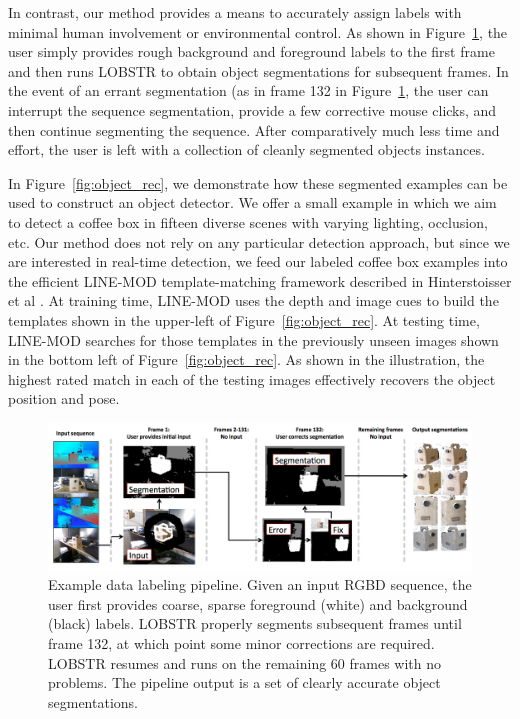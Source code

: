 \documentclass[graybox]{svmult}
\begin{document}
In contrast, our method provides a means to accurately assign labels with minimal human involvement or environmental control. As shown in Figure~\ref{fig:data_labeling}, the user simply provides rough background and foreground labels to the first frame and then runs LOBSTR to obtain object segmentations for subsequent frames.  In the event of an errant segmentation (as in frame 132 in  Figure~\ref{fig:data_labeling}, the user can interrupt the sequence segmentation, provide a few corrective mouse clicks, and then continue segmenting the sequence.  After comparatively much less time and effort, the user is left with a collection of cleanly segmented objects instances.

In Figure~\ref{fig:object_rec}, we demonstrate how these segmented examples can be used to construct an object detector. We offer a small example in which we aim to detect a coffee box in fifteen diverse scenes with varying lighting, occlusion, etc.  Our method does not rely on any particular  detection approach, but since we are interested in real-time detection, we feed our labeled coffee box examples into the efficient LINE-MOD template-matching framework described in Hinterstoisser et al \cite{hinterstoisser2011a}. At training time, LINE-MOD uses the depth and image cues to build the templates shown in the upper-left of Figure~\ref{fig:object_rec}. At testing time, LINE-MOD searches for those templates in the previously unseen images shown in the bottom left of Figure~\ref{fig:object_rec}.  As shown in the illustration, the highest rated match in each of the testing images effectively recovers the object position and pose.

\begin{figure}
\centering
        \includegraphics[width=\linewidth]{img/data_labeling.png}
\caption{\small{Example data labeling pipeline. Given an input RGBD sequence, the user first provides coarse, sparse foreground (white) and background (black) labels.  LOBSTR properly segments subsequent frames until frame 132, at which point some minor corrections are required. LOBSTR resumes and runs on the remaining 60 frames with no problems. The pipeline output is a set of clearly accurate object segmentations. }}
\label{fig:data_labeling}
\end{figure}
\end{document}
